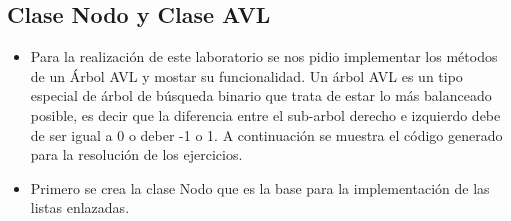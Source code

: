 \documentclass{article}
\begin{document}
	\subsection{Clase Nodo y Clase AVL}
	\begin{itemize}	
		\item Para la realización de este laboratorio se nos pidio implementar los métodos de un Árbol AVL y mostar su funcionalidad. Un árbol AVL es un tipo especial de árbol de búsqueda binario que trata de estar lo más balanceado posible, es decir que la diferencia entre el sub-arbol derecho e izquierdo debe de ser igual a 0 o deber -1 o 1. A continuación se muestra el código generado para la resolución de los ejercicios.
		\item Primero se crea la clase Nodo que es la base para la implementación de las listas enlazadas.
	\end{itemize}	
		
\end{document}
